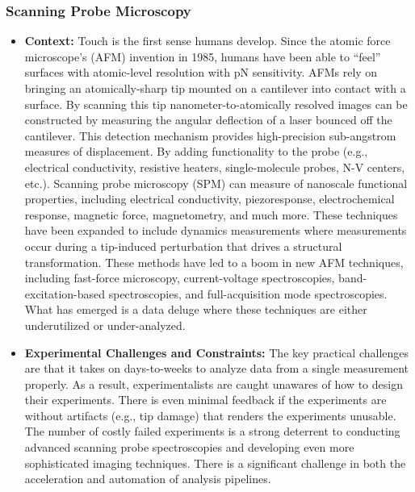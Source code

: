 \subsubsection{Scanning Probe Microscopy}
\begin{itemize}
    \item \textbf{Context:} Touch is the first sense humans develop. Since the atomic force microscope’s (AFM) invention in 1985\cite{Binnig1986-ig}, humans have been able to “feel” surfaces with atomic-level resolution with pN sensitivity. AFMs rely on bringing an atomically-sharp tip mounted on a cantilever into contact with a surface. By scanning this tip nanometer-to-atomically resolved images can be constructed by measuring the angular deflection of a laser bounced off the cantilever. This detection mechanism provides high-precision sub-angstrom measures of displacement. By adding functionality to the probe (e.g., electrical conductivity\cite{Benstetter2009-oe}, resistive heaters\cite{King2005-sc}, single-molecule probes\cite{Oberhauser2002-cs}, N-V centers\cite{Ariyaratne2018-hg}, etc.). Scanning probe microscopy (SPM) can measure of nanoscale functional properties, including electrical conductivity\cite{Seidel2010-uv,Gomez-Navarro2005-pu}, piezoresponse\cite{Jesse2011-tv}, electrochemical response\cite{Jesse2012-gh}, magnetic force\cite{Kazakova2019-dj}, magnetometry\cite{Casola2018-ms}, and much more. These techniques have been expanded to include dynamics measurements where measurements occur during a tip-induced perturbation that drives a structural transformation. These methods have led to a boom in new AFM techniques, including fast-force microscopy\cite{Benaglia2018-js}, current-voltage spectroscopies\cite{Holstad2020-kq}, band-excitation-based spectroscopies\cite{Jesse2018-jw}, and full-acquisition mode spectroscopies\cite{Somnath2015-qk}. What has emerged is a data deluge where these techniques are either underutilized or under-analyzed.
    \item \textbf{Experimental Challenges and Constraints:} The key practical challenges are that it takes on days-to-weeks to analyze data from a single measurement properly. As a result, experimentalists are caught unawares of how to design their experiments. There is even minimal feedback if the experiments are without artifacts (e.g., tip damage) that renders the experiments unusable. The number of costly failed experiments is a strong deterrent to conducting advanced scanning probe spectroscopies and developing even more sophisticated imaging techniques. There is a significant challenge in both the acceleration and automation of analysis pipelines. 

\end{itemize}

